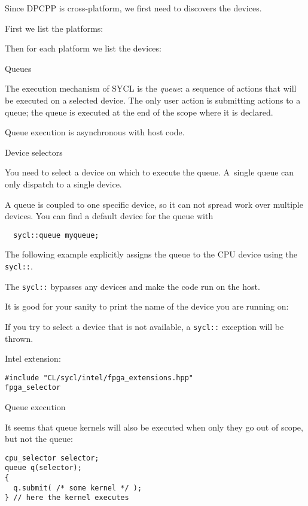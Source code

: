 Since \ac{DPCPP} is cross-platform, we first need to discovers
the devices.

First we list the platforms:

Then for each platform we list the devices:

 {Queues}

The execution mechanism of SYCL is the
\emph{queue}:
a sequence of actions that will be executed on a selected device.
The only user action is submitting actions to a queue;
the queue is executed at the end of the scope where it is declared.

Queue execution is asynchronous with host code.

 {Device selectors}

You need to select a device on which to execute the queue.
A~single queue can only dispatch to a single device.

A queue is coupled to one specific device,
so it can not spread work over multiple devices.
You can find a default device for the queue with
\begin{lstlisting}
  sycl::queue myqueue;
\end{lstlisting}

The following example explicitly assigns the queue to the CPU device
using the \lstinline+sycl::+.

The \lstinline+sycl::+ bypasses any devices and
make the code run on the host.

It is good for your sanity to print the name of the device
you are running on:

If you try to select a device that is not available,
a \lstinline+sycl::+ exception will be thrown.

Intel extension:
\begin{lstlisting}
#include "CL/sycl/intel/fpga_extensions.hpp"
fpga_selector
\end{lstlisting}

 {Queue execution}

It seems that queue kernels will also be executed when only they
go out of scope, but not the queue:
\begin{lstlisting}
cpu_selector selector;
queue q(selector);
{
  q.submit( /* some kernel */ );
} // here the kernel executes
\end{lstlisting}

